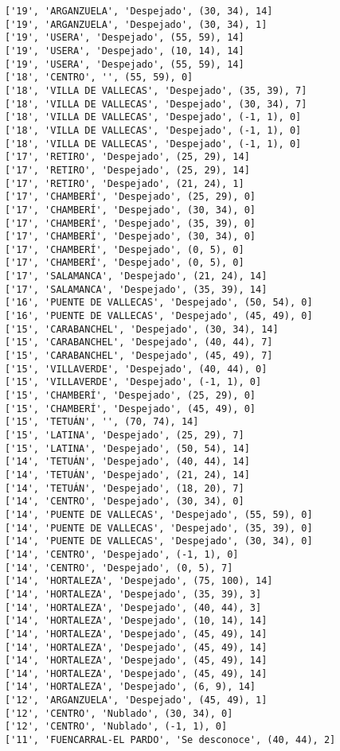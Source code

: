 \documentclass[11pt]{article}
\begin{document}
\begin{Verbatim}[commandchars=\\\{\}]
['19', 'ARGANZUELA', 'Despejado', (30, 34), 14]
['19', 'ARGANZUELA', 'Despejado', (30, 34), 1]
['19', 'USERA', 'Despejado', (55, 59), 14]
['19', 'USERA', 'Despejado', (10, 14), 14]
['19', 'USERA', 'Despejado', (55, 59), 14]
['18', 'CENTRO', '', (55, 59), 0]
['18', 'VILLA DE VALLECAS', 'Despejado', (35, 39), 7]
['18', 'VILLA DE VALLECAS', 'Despejado', (30, 34), 7]
['18', 'VILLA DE VALLECAS', 'Despejado', (-1, 1), 0]
['18', 'VILLA DE VALLECAS', 'Despejado', (-1, 1), 0]
['18', 'VILLA DE VALLECAS', 'Despejado', (-1, 1), 0]
['17', 'RETIRO', 'Despejado', (25, 29), 14]
['17', 'RETIRO', 'Despejado', (25, 29), 14]
['17', 'RETIRO', 'Despejado', (21, 24), 1]
['17', 'CHAMBERÍ', 'Despejado', (25, 29), 0]
['17', 'CHAMBERÍ', 'Despejado', (30, 34), 0]
['17', 'CHAMBERÍ', 'Despejado', (35, 39), 0]
['17', 'CHAMBERÍ', 'Despejado', (30, 34), 0]
['17', 'CHAMBERÍ', 'Despejado', (0, 5), 0]
['17', 'CHAMBERÍ', 'Despejado', (0, 5), 0]
['17', 'SALAMANCA', 'Despejado', (21, 24), 14]
['17', 'SALAMANCA', 'Despejado', (35, 39), 14]
['16', 'PUENTE DE VALLECAS', 'Despejado', (50, 54), 0]
['16', 'PUENTE DE VALLECAS', 'Despejado', (45, 49), 0]
['15', 'CARABANCHEL', 'Despejado', (30, 34), 14]
['15', 'CARABANCHEL', 'Despejado', (40, 44), 7]
['15', 'CARABANCHEL', 'Despejado', (45, 49), 7]
['15', 'VILLAVERDE', 'Despejado', (40, 44), 0]
['15', 'VILLAVERDE', 'Despejado', (-1, 1), 0]
['15', 'CHAMBERÍ', 'Despejado', (25, 29), 0]
['15', 'CHAMBERÍ', 'Despejado', (45, 49), 0]
['15', 'TETUÁN', '', (70, 74), 14]
['15', 'LATINA', 'Despejado', (25, 29), 7]
['15', 'LATINA', 'Despejado', (50, 54), 14]
['14', 'TETUÁN', 'Despejado', (40, 44), 14]
['14', 'TETUÁN', 'Despejado', (21, 24), 14]
['14', 'TETUÁN', 'Despejado', (18, 20), 7]
['14', 'CENTRO', 'Despejado', (30, 34), 0]
['14', 'PUENTE DE VALLECAS', 'Despejado', (55, 59), 0]
['14', 'PUENTE DE VALLECAS', 'Despejado', (35, 39), 0]
['14', 'PUENTE DE VALLECAS', 'Despejado', (30, 34), 0]
['14', 'CENTRO', 'Despejado', (-1, 1), 0]
['14', 'CENTRO', 'Despejado', (0, 5), 7]
['14', 'HORTALEZA', 'Despejado', (75, 100), 14]
['14', 'HORTALEZA', 'Despejado', (35, 39), 3]
['14', 'HORTALEZA', 'Despejado', (40, 44), 3]
['14', 'HORTALEZA', 'Despejado', (10, 14), 14]
['14', 'HORTALEZA', 'Despejado', (45, 49), 14]
['14', 'HORTALEZA', 'Despejado', (45, 49), 14]
['14', 'HORTALEZA', 'Despejado', (45, 49), 14]
['14', 'HORTALEZA', 'Despejado', (45, 49), 14]
['14', 'HORTALEZA', 'Despejado', (6, 9), 14]
['12', 'ARGANZUELA', 'Despejado', (45, 49), 1]
['12', 'CENTRO', 'Nublado', (30, 34), 0]
['12', 'CENTRO', 'Nublado', (-1, 1), 0]
['11', 'FUENCARRAL-EL PARDO', 'Se desconoce', (40, 44), 2]

\end{Verbatim}
\end{document}
